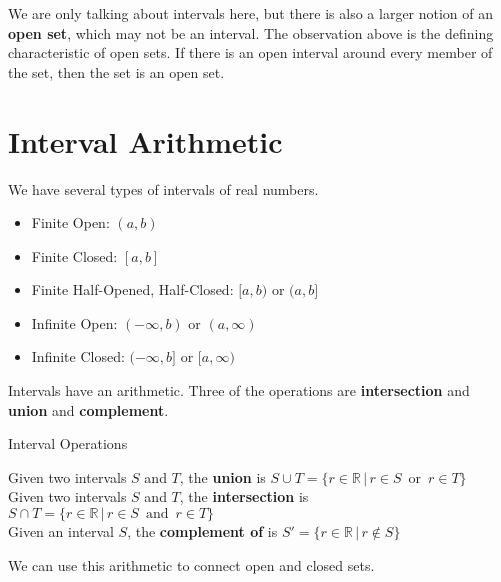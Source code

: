 \documentclass{ximera}
\begin{document}
We are only talking about intervals here, but there is also a larger notion of an \textbf{open set}, which may not be an interval.  The observation above is the defining characteristic of open sets.  If there is an open interval around every member of the set, then the set is an open set.






\section{Interval Arithmetic}


We have several types of intervals of real numbers.


\begin{itemize}
\item Finite Open:   $(a, b)$
\item Finite Closed: $[a, b]$
\item Finite Half-Opened, Half-Closed:  $[a, b)$  or $(a,b]$ \\

\item Infinite Open: $(-\infty, b)$ or $(a, \infty)$
\item Infinite Closed: $(-\infty, b]$ or $[a, \infty)$

\end{itemize}



Intervals have an arithmetic. Three of the operations are \textbf{intersection} and \textbf{union} and \textbf{complement}.



\begin{definition} Interval Operations


Given two intervals $S$ and $T$, the \textbf{union} is $S \cup T = \{ r \in \mathbb{R} \, | \, r \in S \, \text{ or } \, r \in T    \}$ \\

Given two intervals $S$ and $T$, the \textbf{intersection} is $S \cap T = \{ r \in \mathbb{R} \, | \, r \in S \, \text{ and } \, r \in T    \}$ \\
 
Given an interval $S$, the \textbf{complement of} is $S'  = \{ r \in \mathbb{R} \, | \, r \not\in S  \}$ 


\end{definition}




We can use this arithmetic to connect open and closed sets.
\end{document}

